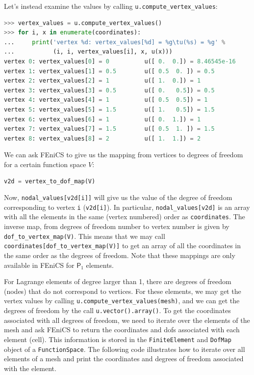 \documentclass[graybox,envcountchap,sectrefs,final]{svmonodo}
\begin{document}
\vspace{6mm}




Let's instead examine the values by calling
\Verb!u.compute_vertex_values!:

\begin{lstlisting}[language=Python,style=graycolor]
>>> vertex_values = u.compute_vertex_values()
>>> for i, x in enumerate(coordinates):
...     print('vertex %d: vertex_values[%d] = %g\tu(%s) = %g' %
...           (i, i, vertex_values[i], x, u(x)))
vertex 0: vertex_values[0] = 0          u([ 0.  0.]) = 8.46545e-16
vertex 1: vertex_values[1] = 0.5        u([ 0.5  0. ]) = 0.5
vertex 2: vertex_values[2] = 1          u([ 1.  0.]) = 1
vertex 3: vertex_values[3] = 0.5        u([ 0.   0.5]) = 0.5
vertex 4: vertex_values[4] = 1          u([ 0.5  0.5]) = 1
vertex 5: vertex_values[5] = 1.5        u([ 1.   0.5]) = 1.5
vertex 6: vertex_values[6] = 1          u([ 0.  1.]) = 1
vertex 7: vertex_values[7] = 1.5        u([ 0.5  1. ]) = 1.5
vertex 8: vertex_values[8] = 2          u([ 1.  1.]) = 2
\end{lstlisting}


We can ask FEniCS to give us the mapping from vertices to degrees of
freedom for a certain function space $V$:

\begin{lstlisting}[language=Python,style=graycolor]
v2d = vertex_to_dof_map(V)
\end{lstlisting}
Now, \Verb!nodal_values[v2d[i]]! will give us the value of the degree of
freedom
corresponding to vertex \texttt{i} (\texttt{v2d[i]}). In particular, \Verb!nodal_values[v2d]!
is an array with all the elements in the same (vertex numbered) order
as \texttt{coordinates}. The inverse map, from degrees of freedom number to
vertex number is given by \Verb!dof_to_vertex_map(V)!. This means that
we may call
\Verb!coordinates[dof_to_vertex_map(V)]! to get an array of all the
coordinates in the same order as the degrees of freedom. Note that
these mappings are only available in FEniCS for $\mathsf{P}_1$ elements.

For Lagrange elements of degree larger than 1, there are degrees of
freedom (nodes) that do not correspond to vertices. For these
elements, we may get the vertex values by calling
\Verb!u.compute_vertex_values(mesh)!, and we can get the degrees of freedom
by the call \texttt{u.vector().array()}. To get the coordinates associated
with all degrees of freedom, we need to iterate over the elements of
the mesh and ask FEniCS to return the coordinates and dofs associated
with each element (cell). This information is stored in the
\texttt{FiniteElement} and \texttt{DofMap} object of a \texttt{FunctionSpace}. The
following code illustrates how to iterate over all elements of a mesh
and print the coordinates and degrees of freedom associated with the
element.
\end{document}
